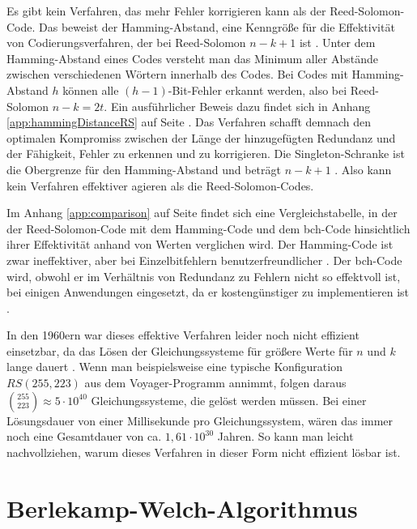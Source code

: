 Es gibt kein Verfahren, das mehr Fehler korrigieren kann als der Reed-Solomon-Code.
Das beweist der Hamming-Abstand, eine Kenngröße für die Effektivität von Codierungsverfahren, der bei Reed-Solomon $n-k+1$ ist \cite{reedPolynomialCodesCertain1960}.
Unter dem Hamming-Abstand eines Codes versteht man das Minimum aller Abstände zwischen verschiedenen Wörtern innerhalb des Codes.
Bei Codes mit Hamming-Abstand $h$ können alle $(h-1)$-Bit-Fehler erkannt werden, also bei Reed-Solomon $n-k=2t$.
Ein ausführlicher Beweis dazu findet sich in Anhang \ref{app:hammingDistanceRS} auf Seite \pageref{app:hammingDistanceRS}.
Das Verfahren schafft demnach den optimalen Kompromiss zwischen der Länge der hinzugefügten Redundanz und der Fähigkeit, Fehler zu erkennen und zu korrigieren.
Die Singleton-Schranke ist die Obergrenze für den Hamming-Abstand und beträgt $n-k+1$ \cite{friedrichsKanalcodierung1996}.
Also kann kein Verfahren effektiver agieren als die Reed-Solomon-Codes.

Im Anhang \ref{app:comparison} auf Seite \pageref{app:comparison} findet sich eine Vergleichstabelle, in der der Reed-Solomon-Code mit dem Hamming-Code und dem \acrshort{bch}-Code hinsichtlich ihrer Effektivität anhand von Werten verglichen wird.
Der Hamming-Code ist zwar ineffektiver, aber bei Einzelbitfehlern benutzerfreundlicher \cite{williamsHammingCodeFehlererkennungUnd2024}.
Der \acrshort{bch}-Code wird, obwohl er im Verhältnis von Redundanz zu Fehlern nicht so effektvoll ist, bei einigen Anwendungen eingesetzt, da er kostengünstiger zu implementieren ist \cite{schulz-hankeBCHCodesCombined2023}. 

In den 1960ern war dieses effektive Verfahren leider noch nicht effizient einsetzbar, da das Lösen der Gleichungssysteme für größere Werte für $n$ und $k$ lange dauert \cite{verbeureReedSolomonErrorCorrecting2022}. 
Wenn man beispielsweise eine typische Konfiguration $RS(255,223)$ aus dem Voyager-Programm annimmt, folgen daraus $\binom{255}{223}\approx5\cdot 10^{40}$ Gleichungssysteme, die gelöst werden müssen.
Bei einer Lösungsdauer von einer Millisekunde pro Gleichungssystem, wären das immer noch eine Gesamtdauer von ca. $1,61\cdot10^{30}$ Jahren. 
So kann man leicht nachvollziehen, warum dieses Verfahren in dieser Form nicht effizient lösbar ist.

\section{Berlekamp-Welch-Algorithmus}\label{sec:bwAlgo}

